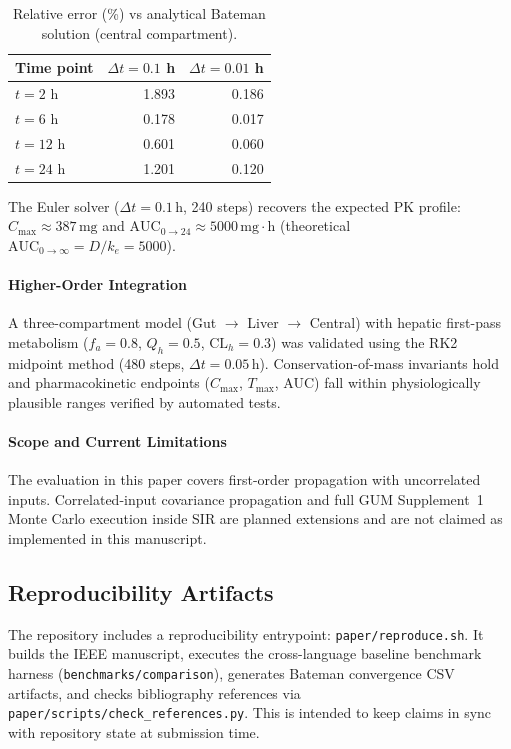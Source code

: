 \documentclass[journal]{IEEEtran}
\begin{document}
\begin{table}[!t]
\caption{Relative error (\%) vs analytical Bateman solution (central compartment).}
\label{tab:bateman-errors}
\centering
\begin{tabular}{lrr}
\toprule
Time point & $\Delta t=0.1$ h & $\Delta t=0.01$ h \\
\midrule
$t=2$ h & 1.893 & 0.186 \\
$t=6$ h & 0.178 & 0.017 \\
$t=12$ h & 0.601 & 0.060 \\
$t=24$ h & 1.201 & 0.120 \\
\bottomrule
\end{tabular}
\end{table}

The Euler solver ($\Delta t = 0.1\,\text{h}$, 240 steps) recovers the
expected PK profile: $C_{\max} \approx 387\,\text{mg}$ and
$\text{AUC}_{0 \to 24} \approx 5000\,\text{mg}\!\cdot\!\text{h}$
(theoretical $\text{AUC}_{0 \to \infty} = D/k_e = 5000$).

\paragraph{Higher-Order Integration}
A three-compartment model (Gut $\to$ Liver $\to$ Central) with hepatic
first-pass metabolism ($f_a = 0.8$, $Q_h = 0.5$, $\text{CL}_h = 0.3$)
was validated using the RK2 midpoint method (480 steps,
$\Delta t = 0.05\,\text{h}$). Conservation-of-mass invariants hold and
pharmacokinetic endpoints ($C_{\max}$, $T_{\max}$, AUC) fall within
physiologically plausible ranges verified by automated tests.

\paragraph{Scope and Current Limitations}
The evaluation in this paper covers first-order propagation with
uncorrelated inputs. Correlated-input covariance propagation and full GUM
Supplement~1 Monte Carlo execution inside SIR are planned extensions and
are not claimed as implemented in this manuscript.

\subsection{Reproducibility Artifacts}
The repository includes a reproducibility entrypoint:
\texttt{paper/reproduce.sh}. It builds the IEEE manuscript, executes the
cross-language baseline benchmark harness (\texttt{benchmarks/comparison}),
generates Bateman convergence CSV artifacts, and checks bibliography
references via \texttt{paper/scripts/check\_references.py}. This is
intended to keep claims in sync with repository state at submission time.
\end{document}
